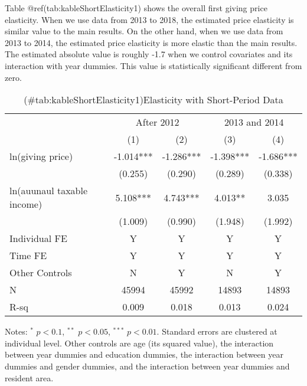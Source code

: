 \documentclass[
]{article}
\begin{document}
\color{black}

Table @ref(tab:kableShortElasticity1) shows the overall first giving price elasticity.
When we use data from 2013 to 2018, the estimated price elasticity is similar value to the main results.
On the other hand,
when we use data from 2013 to 2014, the estimated price elasticity is more elastic than the main results.
The estimated absolute value is roughly -1.7 when we control covariates and its interaction with year dummies.
This value is statistically significant different from zero.

\begin{table}

\caption{(\#tab:kableShortElasticity1)Elasticity with Short-Period Data}
\centering
\fontsize{7}{9}\selectfont
\begin{threeparttable}
\begin{tabular}[t]{lcccc}
\toprule
\multicolumn{1}{c}{ } & \multicolumn{2}{c}{After 2012} & \multicolumn{2}{c}{2013 and 2014} \\
\cmidrule(l{3pt}r{3pt}){2-3} \cmidrule(l{3pt}r{3pt}){4-5}
 & (1) & (2) & (3) & (4)\\
\midrule
ln(giving price) & -1.014*** & -1.286*** & -1.398*** & -1.686***\\
 & (0.255) & (0.290) & (0.289) & (0.338)\\
ln(auunaul taxable income) & 5.108*** & 4.743*** & 4.013** & 3.035\\
 & (1.009) & (0.990) & (1.948) & (1.992)\\
Individual FE & Y & Y & Y & Y\\
Time FE & Y & Y & Y & Y\\
Other Controls & N & Y & N & Y\\
N & 45994 & 45992 & 14893 & 14893\\
R-sq & 0.009 & 0.018 & 0.013 & 0.024\\
\bottomrule
\end{tabular}
\begin{tablenotes}
\item Notes: $^{*}$ $p < 0.1$, $^{**}$ $p < 0.05$, $^{***}$ $p < 0.01$. Standard errors are clustered at individual level. Other controls are age (its squared value), the interaction between year dummies and education dummies, the interaction between year dummies and gender dummies, and the interaction between year dummies and resident area.
\end{tablenotes}
\end{threeparttable}
\end{table}
\end{document}
